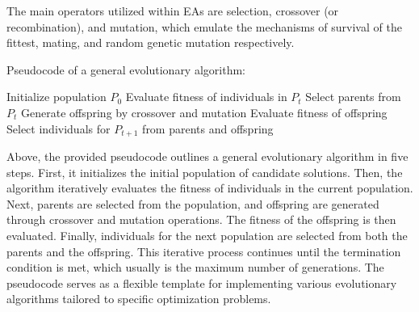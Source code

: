\documentclass[twoside]{ctuthesis}
\theoremstyle{plain}
\theoremstyle{definition}
\theoremstyle{note}
\begin{document}
The main operators utilized within EAs are selection, crossover (or recombination), and mutation, which emulate the mechanisms of survival of the fittest, mating, and random genetic mutation respectively.

Pseudocode of a general evolutionary algorithm:
\begin{algorithmic}[1]
	\State Initialize population $P_0$
	\State Evaluate fitness of individuals in $P_t$
	\State Select parents from $P_t$
	\State Generate offspring by crossover and mutation
	\State Evaluate fitness of offspring
	\State Select individuals for $P_{t+1}$ from parents and offspring
	\EndWhile
\end{algorithmic}

Above, the provided pseudocode outlines a general evolutionary algorithm in five steps. First, it initializes the initial population of candidate solutions. Then, the algorithm iteratively evaluates the fitness of individuals in the current population. Next, parents are selected from the population, and offspring are generated through crossover and mutation operations. The fitness of the offspring is then evaluated. Finally, individuals for the next population are selected from both the parents and the offspring. This iterative process continues until the termination condition is met, which usually is the maximum number of generations. The pseudocode serves as a flexible template for implementing various evolutionary algorithms tailored to specific optimization problems.
\end{document}
